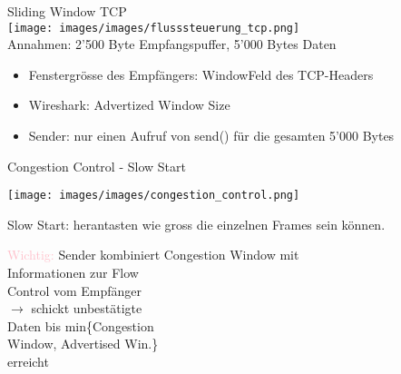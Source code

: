 \begin{example} Sliding Window TCP\\
        \texttt{[image: images/images/flusssteuerung\_tcp.png]}\\
    Annahmen: 2'500 Byte Empfangspuffer, 5'000 Bytes Daten
    \begin{itemize}
        \item Fenstergrösse des Empfängers: WindowFeld des TCP-Headers
        \item Wireshark: Advertized Window Size
        \item Sender: nur einen Aufruf von send() für die gesamten 5'000 Bytes
    \end{itemize}
\end{example}

\begin{concept}{Congestion Control - Slow Start}\\
    \begin{minipage}{0.6\linewidth}
        \texttt{[image: images/images/congestion\_control.png]}
    \end{minipage}
    \begin{minipage}{0.39\linewidth}
        {\small
        Slow Start: herantasten wie gross die einzelnen Frames sein können.

        \vspace{1mm}

        \textcolor{pink}{Wichtig:} Sender kombiniert Congestion Window mit\\ Informationen zur Flow\\ Control vom Empfänger\\ $\rightarrow$ schickt unbestätigte \\Daten bis min\{Congestion\\ Window, Advertised Win.\}\\ erreicht
        }
    \end{minipage}
\end{concept}

